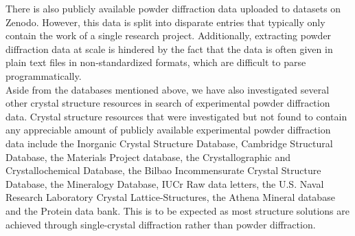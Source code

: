 There is also publicly available powder diffraction data uploaded to datasets on Zenodo. However, this data is split into disparate entries that typically only contain the work of a single research project. Additionally, extracting powder diffraction data at scale is hindered by the fact that the data is often given in plain text files in non-standardized formats, which are difficult to parse programmatically. \\

Aside from the databases mentioned above, we have also investigated several other crystal structure resources in search of experimental powder diffraction data. Crystal structure resources that were investigated but not found to contain any appreciable amount of publicly available experimental powder diffraction data include the Inorganic Crystal Structure Database,   Cambridge Structural Database,  the Materials Project database,  the Crystallographic and Crystallochemical Database, the Bilbao Incommensurate Crystal Structure Database,  the Mineralogy Database, IUCr Raw data letters, the U.S. Naval Research Laboratory Crystal Lattice-Structures, the Athena Mineral database and the Protein data bank.  This is to be expected as most structure solutions are achieved through single-crystal diffraction rather than powder diffraction.\\ 

